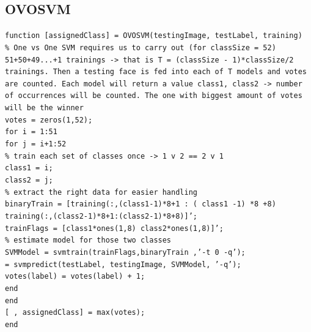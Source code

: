 \documentclass[10pt,twocolumn,letterpaper]{article}
\begin{document}
\subsection{OVOSVM}
{\tt\small function [assignedClass] = OVOSVM(testingImage, testLabel, training) \\

\% One vs One SVM requires us to carry out (for classSize = 52)
51+50+49...+1 trainings -> that is T = (classSize - 1)*classSize/2 trainings. Then a testing face is fed into each of T models and votes are counted. Each model will return a value {class1, class2} -> number of occurrences will be counted. The one with biggest amount of votes will be the winner\\

votes = zeros(1,52);\\
for i = 1:51\\
\indent for j = i+1:52\\
        
\% train each set of classes once -> 1 v 2 == 2 v 1\\
\indent \indent class1 = i;\\
\indent \indent class2 = j;\\
        
        \% extract the right data for easier handling\\
\indent \indent binaryTrain = [training(:,(class1-1)*8+1 : ( class1 -1) *8 +8) training(:,(class2-1)*8+1:(class2-1)*8+8)]';\\
\indent \indent trainFlags = [class1*ones(1,8) class2*ones(1,8)]';\\
        
        \% estimate model for those two classes\\
        
\indent \indent SVMModel = svmtrain(trainFlags,binaryTrain ,'-t 0 -q');\\
        
\indent \indent [label,~,~] = svmpredict(testLabel, testingImage, SVMModel, '-q');\\

\indent \indent votes(label) = votes(label) + 1;\\
        
\indent end\\
end\\

[~, assignedClass] = max(votes);\\
end\\
}
\end{document}
